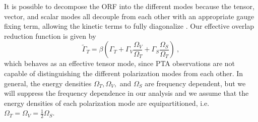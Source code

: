 \documentclass[prd,twocolumn,aps,psfig,nofootinbib,nobibnotes,superscriptaddress,preprintnumbers,times]{revtex4-2}
\begin{document}
It is possible to decompose the ORF into the different modes because the tensor, vector, and scalar modes all decouple from each other with an appropriate gauge fixing term, allowing the kinetic terms to fully diagonalize \cite{Hinterbichler:2011tt}. Our effective overlap reduction function is given by 
\begin{equation}\label{eq:eff_orf}
    \tilde{\Gamma}_{T} = \beta \left(\Gamma_{T} + \Gamma_{V} \frac{\Omega_V}{\Omega_T} + \Gamma_{S} \frac{\Omega_S}{\Omega_T} \right) \ ,
\end{equation}
which behaves as an effective tensor mode, since PTA observations are not capable of distinguishing the different polarization modes from each other. In general, the energy densities $\Omega_T, \Omega_V,$ and $\Omega_S$ are frequency dependent, but we will suppress the frequency dependence in our analysis and we assume that the energy densities of each polarization mode are equipartitioned, i.e.\ $\Omega_T = \Omega_V = \frac{1}{2}\Omega_S$. 
\end{document}

